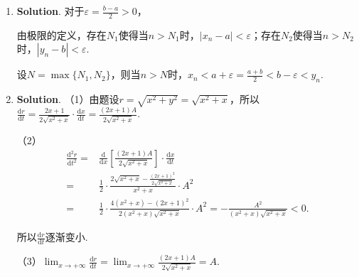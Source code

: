 \documentclass[../Main.tex]{subfiles}
\begin{document}
\begin{enumerate}
    \item \textbf{Solution}. 对于$\varepsilon=\frac{b-a}{2}>0$，

          由极限的定义，存在$N_{1}$使得当$n>N_{1}$时，$|x_{n}-a|<\varepsilon$；存在$N
                  _{2}$使得当$n>N_{2}$时，$|y_{n}-b|<\varepsilon$.

          设$N=\max\{N_{1},N_{2}\}$，则当$n>N$时，$x_{n}<a+\varepsilon=\frac{a+b}{2}<
              b-\varepsilon<y_{n}$.

    \item \textbf{Solution}. （1）由题设$r=\sqrt{x^{2}+y^{2}}=\sqrt{x^{2}+x}$，所以$\frac{\mathrm{d}r}{\mathrm{d}t}
              =\frac{2x+1}{2\sqrt{x^{2}+x}}\cdot\frac{\mathrm{d}x}{\mathrm{d}t}=\frac{(2x+1)A}{2\sqrt{x^{2}+x}}$.

          （2）
          \[
              \begin{aligned}
                  \frac{\mathrm{d}^2 r}{\mathrm{d}t^2}= & \frac{\mathrm{d}}{\mathrm{d}x}\left[\frac{(2x+1)A}{2\sqrt{x^2+x}}\right]\cdot\frac{\mathrm{d}x}{\mathrm{d}t}    \\
                  =                                     & \frac{1}{2}\cdot\frac{2\sqrt{x^2+x}-\frac{(2x+1)^2}{2\sqrt{x^2+x}}}{x^2+x}\cdot A^{2}                           \\
                  =                                     & \frac{1}{2}\cdot\frac{4(x^2+x)-(2x+1)^2}{2(x^2+x)\sqrt{x^2+x}}\cdot A^{2} = -\frac{A^2}{(x^2+x)\sqrt{x^2+x}}<0.
              \end{aligned}
          \]

          所以$\frac{\mathrm{d}r}{\mathrm{d}t}$逐渐变小.

          （3）$\lim_{x\to+\infty}\frac{\mathrm{d}r}{\mathrm{d}t}=\lim_{x\to+\infty}\frac{(2x+1)A}{2\sqrt{x^{2}+x}}
              =A$.
\end{enumerate}
\end{document}
